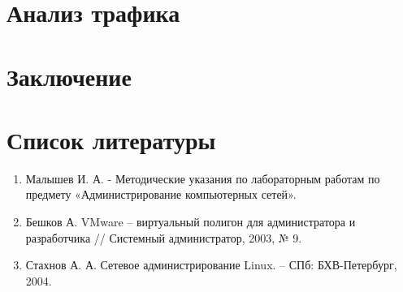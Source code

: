 \documentclass[a4paper, 12pt]{article}		%
\begin{document}

\tableofcontents








\newpage
\section{Анализ трафика}


\newpage
\section*{Заключение}




\newpage
\section*{Список литературы}

\begin{enumerate}
\item Малышев И. А. - Методические указания по лабораторным работам по предмету «Администрирование компьютерных сетей».
\item Бешков А. VMware – виртуальный полигон для администратора и разработчика // Системный администратор, 2003, № 9.
\item Стахнов А. А. Сетевое администрирование Linux. – СПб: БХВ-Петербург, 2004.
\end{enumerate}
\end{document}

